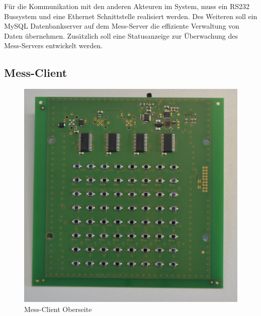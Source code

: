 Für die Kommunikation mit den anderen Akteuren im System, muss ein RS232 Bussystem und eine Ethernet Schnittstelle realisiert werden. Des Weiteren soll ein MySQL Datenbankserver auf dem Mess-Server die effiziente Verwaltung von Daten übernehmen. Zusätzlich soll eine Statusanzeige zur Überwachung des Mess-Servers entwickelt werden.


\subsection{Mess-Client}
\label{section_Mess-Client}
 
 \begin{figure}[H]
  \includegraphics[width=\linewidth]{img/general/DegraBoardTop.jpg}
  \caption{Mess-Client Oberseite}\label{figure_DegraBoardTop}
\endminipage\hfill
{}%

\end{figure}
